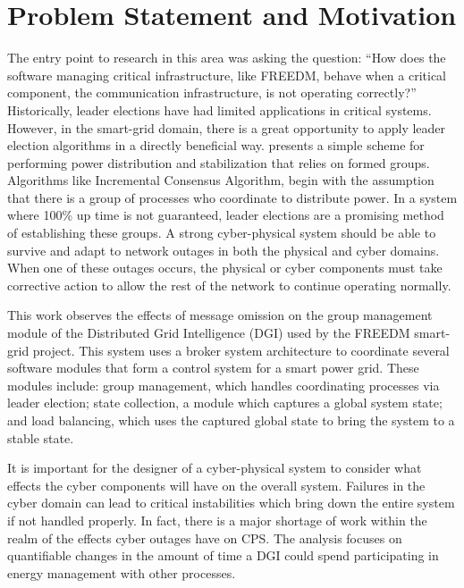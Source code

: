 \chapter{Problem Statement and Motivation}

The entry point to research in this area was asking the question: ``How does the software managing critical infrastructure, like FREEDM, behave when a critical component, the communication infrastructure, is not operating correctly?'' 
Historically, leader elections have had limited applications in critical systems. However, in the smart-grid domain, there is a great opportunity to apply leader election algorithms in a directly beneficial way. \cite{LOADBALANCING} presents a simple scheme for performing power distribution and stabilization that relies on formed groups. Algorithms like Incremental Consensus Algorithm\cite{INCREMENTALCONSENSUS}, begin with the assumption that there is a group of processes who coordinate to distribute power. In a system where 100\% up time is not guaranteed, leader elections are a promising method of establishing these groups.
A strong cyber-physical system should be able to survive and adapt to network outages in both the physical and cyber domains. When one of these outages occurs, the physical or cyber components must take corrective action to allow the rest of the network to continue operating normally.

This work observes the effects of message omission on the group management module of the Distributed Grid Intelligence (DGI) used by the FREEDM smart-grid project. This system uses a broker system architecture to coordinate several software modules that form a control system for a smart power grid. These modules include: group management, which handles coordinating processes via leader election; state collection, a module which
captures a global system state; and load balancing, which uses the captured global state to bring the system to a stable state.

It is important for the designer of a cyber-physical system to consider what effects the cyber components will have on the overall system. Failures in the cyber domain can lead to critical instabilities which bring down the entire system if not handled properly.  In fact, there is a major shortage of work within the realm of the effects cyber outages have on \ac{CPS}\cite{CYBERRESEARCHCALL}\cite{SMARTGRIDBENEFITS}.
The analysis focuses on quantifiable changes in the amount of time a \ac{DGI} could spend participating in energy management with other processes.

